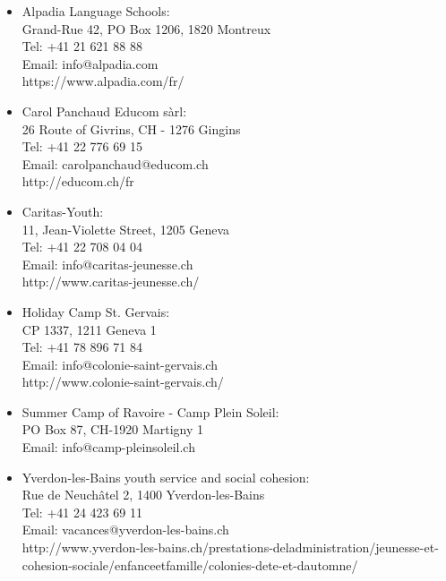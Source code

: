 \begin{itemize}
\vspace{4pt}
\item Alpadia Language Schools: \\
Grand-Rue 42, PO Box 1206, 1820 Montreux\\
Tel: +41 21 621 88 88\\
Email: info@alpadia.com\\
https://www.alpadia.com/fr/ 

\vspace{4pt}
\item Carol Panchaud Educom sàrl: \\
26 Route of Givrins, CH - 1276 Gingins\\
Tel: +41 22 776 69 15 \\
Email: carolpanchaud@educom.ch \\
http://educom.ch/fr

\vspace{4pt}
\item Caritas-Youth: \\
11, Jean-Violette Street, 1205 Geneva\\
Tel: +41 22 708 04 04\\
Email: info@caritas-jeunesse.ch\\
http://www.caritas-jeunesse.ch/

\vspace{4pt}
\item Holiday Camp St. Gervais: \\
CP 1337, 1211 Geneva 1\\
Tel: +41 78 896 71 84\\
Email: info@colonie-saint-gervais.ch\\
http://www.colonie-saint-gervais.ch/

\vspace{4pt}
\item Summer Camp of Ravoire - Camp Plein Soleil: \\
PO Box 87, CH-1920 Martigny 1\\
Email: info@camp-pleinsoleil.ch

\vspace{4pt}
\item Yverdon-les-Bains youth service and social cohesion: \\
Rue de Neuchâtel 2, 1400 Yverdon-les-Bains\\
Tel: +41 24 423 69 11\\
Email: vacances@yverdon-les-bains.ch\\
http://www.yverdon-les-bains.ch/prestations-deladministration/jeunesse-et-cohesion-sociale/enfanceetfamille/colonies-dete-et-dautomne/


\end{itemize}
